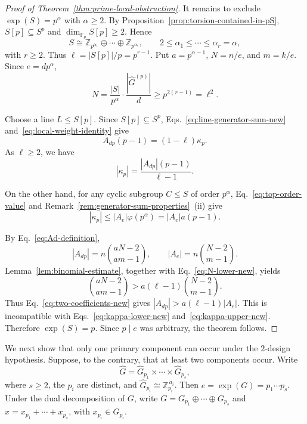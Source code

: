 \documentclass[11pt]{article}
\theoremstyle{definition}
\begin{document}
\begin{proof}[Proof of Theorem~\ref{thm:prime-local-obstruction}]
	It remains to exclude \(\exp(S)=p^\alpha\) with \(\alpha\ge2\). By Proposition~\ref{prop:torsion-contained-in-pS}, \(S[p]\subseteq S^p\) and \(\dim_{\mathbb F_p}S[p]\ge2\). Hence
	\[
	S\cong
	\mathbb Z_{p^{\alpha_1}}\oplus\cdots\oplus\mathbb Z_{p^{\alpha_r}},
	\qquad
	2\le\alpha_1\le\cdots\le\alpha_r=\alpha,
	\]
	with \(r\ge2\). Thus \(\ell=|S[p]|/p=p^{r-1}\). Put
	\(a=p^{\alpha-1}\), \(N=n/e\), and \(m=k/e\). Since
	\(e=dp^\alpha\),
	\begin{equation}\label{eq:N-lower-new}
		N
		=
		\frac{|S|}{p^\alpha}\cdot\frac{|\widehat G^{(p)}|}{d}
		\ge
		p^{2(r-1)}
		=
		\ell^2.
	\end{equation}
	
	Choose a line \(L\le S[p]\).  Since \(S[p]\subseteq S^p\), Eqs.~\eqref{eq:line-generator-sum-new}
	and~\eqref{eq:local-weight-identity} give
	\[
	A_{dp}(p-1)=(1-\ell)\kappa_p.
	\]
	As \(\ell\ge2\), we have
	\begin{equation}\label{eq:kappa-lower-new}
		|\kappa_p|
		=
		\frac{|A_{dp}|(p-1)}{\ell-1}.
	\end{equation}
	
	On the other hand, for any cyclic subgroup \(C\le S\) of order \(p^\alpha\),
	Eq.~\eqref{eq:top-order-value} and Remark~\ref{rem:generator-sum-properties}~(ii)
	give
	\begin{equation}\label{eq:kappa-upper-new}
		|\kappa_p|
		\le
		|A_e|\varphi(p^\alpha)
		=
		|A_e|a(p-1).
	\end{equation}
	
	By Eq.~\eqref{eq:Ad-definition},
	\begin{equation}\label{eq:two-coefficients-new}
		|A_{dp}|
		=
		n\binom{aN-2}{am-1},
		\qquad
		|A_e|
		=
		n\binom{N-2}{m-1}.
	\end{equation}
	Lemma~\ref{lem:binomial-estimate}, together with Eq.~\eqref{eq:N-lower-new},
	yields
	\[
	\binom{aN-2}{am-1}
	>
	a(\ell-1)\binom{N-2}{m-1}.
	\]
	Thus Eq.~\eqref{eq:two-coefficients-new} gives
	\(|A_{dp}|>a(\ell-1)|A_e|\).  This is incompatible with
	Eqs.~\eqref{eq:kappa-lower-new} and~\eqref{eq:kappa-upper-new}.  Therefore
	\(\exp(S)=p\).  Since \(p\mid e\) was arbitrary, the theorem follows.
\end{proof}

We next show that only one primary component can occur under the $2$-design hypothesis. Suppose, to the contrary, that at least two components occur. Write
\[
\widehat G=\widehat G_{p_1}\times\cdots\times\widehat G_{p_s},
\]
where \(s\ge2\), the \(p_i\) are distinct, and \(\widehat G_{p_i}\cong\mathbb Z_{p_i}^{\,a_i}\). Then \(e=\exp(G)=p_1\cdots p_s\). Under the dual decomposition of \(G\), write \(G=G_{p_1}\oplus\cdots\oplus G_{p_s}\) and \(x=x_{p_1}+\cdots+x_{p_s}\), with \(x_{p_i}\in G_{p_i}\).
\end{document}

